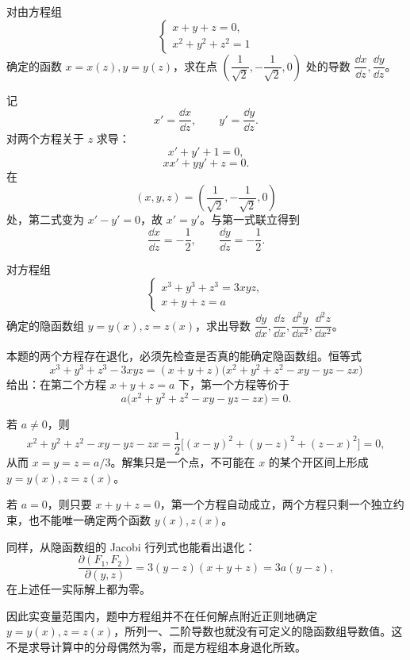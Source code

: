 \begin{xexercise}[2]
对由方程组
  \[
    \begin{cases}
      x+y+z=0,\\
      x^2+y^2+z^2=1
    \end{cases}
  \]
  确定的函数 $x=x(z),y=y(z)$，求在点 $\left(\dfrac1{\sqrt2},-\dfrac1{\sqrt2},0\right)$ 处的导数 $\dfrac{\dd x}{\dd z},\dfrac{\dd y}{\dd z}$。
\end{xexercise}
\begin{xsolution}
记
\[
  x'=\frac{\dd x}{\dd z},\qquad y'=\frac{\dd y}{\dd z}.
\]
对两个方程关于 $z$ 求导：
\[
  x'+y'+1=0,
\]
\[
  xx'+yy'+z=0.
\]
在
\[
  \left(x,y,z\right)
  =\left(\frac1{\sqrt2},-\frac1{\sqrt2},0\right)
\]
处，第二式变为 $x'-y'=0$，故 $x'=y'$。与第一式联立得到
\[
  \boxed{\displaystyle
    \frac{\dd x}{\dd z}=-\frac12,
    \qquad
    \frac{\dd y}{\dd z}=-\frac12}.
\]
\end{xsolution}


\begin{xexercise}[3]
对方程组
  \[
    \begin{cases}
      x^3+y^3+z^3=3xyz,\\
      x+y+z=a
    \end{cases}
  \]
  确定的隐函数组 $y=y(x),z=z(x)$，求出导数 $\dfrac{\dd y}{\dd x},\dfrac{\dd z}{\dd x},\dfrac{\dd^2y}{\dd x^2},\dfrac{\dd^2z}{\dd x^2}$。
\end{xexercise}
\begin{xsolution}
本题的两个方程存在退化，必须先检查是否真的能确定隐函数组。恒等式
\[
  x^3+y^3+z^3-3xyz
  =(x+y+z)
  \bigl(x^2+y^2+z^2-xy-yz-zx\bigr)
\]
给出：在第二个方程 $x+y+z=a$ 下，第一个方程等价于
\[
  a\bigl(x^2+y^2+z^2-xy-yz-zx\bigr)=0.
\]

若 $a\ne0$，则
\[
  x^2+y^2+z^2-xy-yz-zx
  =\frac12\bigl[(x-y)^2+(y-z)^2+(z-x)^2\bigr]=0,
\]
从而 $x=y=z=a/3$。解集只是一个点，不可能在 $x$ 的某个开区间上形成 $y=y(x),z=z(x)$。

若 $a=0$，则只要 $x+y+z=0$，第一个方程自动成立，两个方程只剩一个独立约束，也不能唯一确定两个函数 $y(x),z(x)$。

同样，从隐函数组的 Jacobi 行列式也能看出退化：
\[
  \frac{\partial(F_1,F_2)}{\partial(y,z)}
  =3(y-z)(x+y+z)=3a(y-z),
\]
在上述任一实际解上都为零。

因此实变量范围内，题中方程组并不在任何解点附近正则地确定 $y=y(x),z=z(x)$，所列一、二阶导数也就没有可定义的隐函数组导数值。这不是求导计算中的分母偶然为零，而是方程组本身退化所致。
\end{xsolution}



